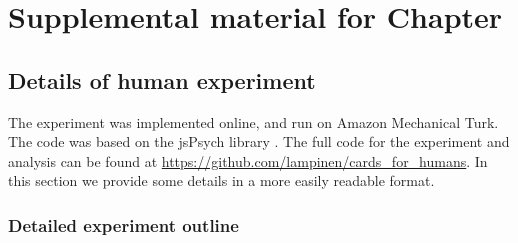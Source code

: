 \chapter{Supplemental material for Chapter } \label{appendix:human}

\section{Details of human experiment}
The experiment was implemented online, and run on Amazon Mechanical Turk. The code was based on the jsPsych library \citep{DeLeeuw2015}. The full code for the experiment and analysis can be found at \url{https://github.com/lampinen/cards_for_humans}. In this section we provide some details in a more easily readable format.

\subsection{Detailed experiment outline}

